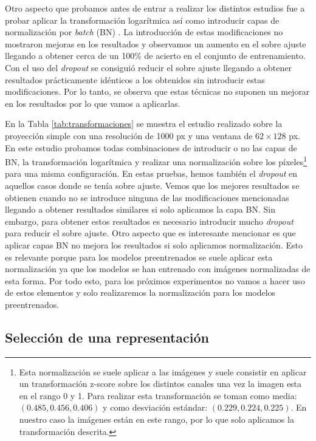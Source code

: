 \documentclass[a4paper,12pt,twoside,titlepage]{article}
\begin{document}
Otro aspecto que probamos antes de entrar a realizar los distintos estudios fue a probar aplicar la transformación logarítmica así como introducir capas de normalización por \textit{batch} (BN) \cite{batchnorm}. La introducción de estas modificaciones no mostraron mejoras en los resultados y observamos un aumento en el sobre ajuste llegando a obtener cerca de un 100\% de acierto en el conjunto de entrenamiento. Con el uso del \textit{dropout} se consiguió reducir el sobre ajuste llegando a obtener resultados prácticamente idénticos a los obtenidos sin introducir estas modificaciones. Por lo tanto, se observa que estas técnicas no suponen un mejorar en los resultados por lo que vamos a aplicarlas. 

En la Tabla \ref{tab:transformaciones} se muestra el estudio realizado sobre la proyección simple con una resolución de 1000 px y una ventana de $62\times128$ px. En este estudio probamos todas combinaciones de introducir o no las capas de BN, la transformación logarítmica y realizar una normalización sobre los píxeles\footnote{Esta normalización se suele aplicar a las imágenes y suele consistir en aplicar un transformación z-score sobre los distintos canales una vez la imagen esta en el rango 0 y 1. Para realizar esta transformación se toman como media: $(0.485, 0.456, 0.406)$ y como desviación estándar: $(0.229, 0.224, 0.225)$. En nuestro caso la imágenes están en este rango, por lo que solo aplicamos la transformación descrita.} para una misma configuración. En estas pruebas, hemos también el \textit{dropout} en aquellos casos donde se tenía sobre ajuste. Vemos que los mejores resultados se obtienen cuando no se introduce ninguna de las modificaciones mencionadas llegando a obtener resultados similares si solo aplicamos la capa BN. Sin embargo, para obtener estos resultados es necesario introducir mucho \textit{dropout} para reducir el sobre ajuste. Otro aspecto que es interesante mencionar es que aplicar capas BN no mejora los resultados si solo aplicamos normalización. Esto es relevante porque para los modelos preentrenados se suele aplicar esta normalización ya que los modelos se han entrenado con imágenes normalizadas de esta forma. Por todo esto, para los próximos experimentos no vamos a hacer uso de estos elementos y solo realizaremos la normalización para los modelos preentrenados.

\subsection{Selección de una representación}
\end{document}
